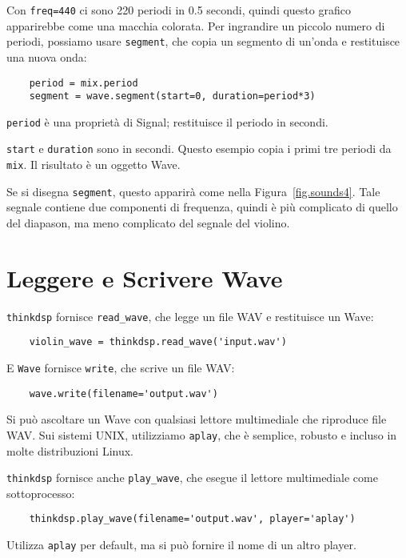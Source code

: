 \documentclass[12pt]{book} \usepackage[width=5.5in,height=8.5in, hmarginratio=3:2,vmarginratio=1:1]{geometry}
\begin{document}
Con {\tt freq=440} ci sono 220 periodi in 0.5 secondi, quindi questo grafico apparirebbe come una macchia colorata. Per ingrandire un piccolo numero di periodi, possiamo usare {\tt segment}, che copia un segmento di un'onda e restituisce una nuova onda:

\begin{verbatim} 
    period = mix.period
    segment = wave.segment(start=0, duration=period*3)
 \end{verbatim} 

{\tt period} è una proprietà di Signal; restituisce il periodo in secondi.

{\tt start} e {\tt duration} sono in secondi. Questo esempio copia i primi tre periodi da {\tt mix}. Il risultato è un oggetto Wave.

Se si disegna {\tt segment}, questo apparirà come nella Figura~\ref{fig.sounds4}. Tale segnale contiene due componenti di frequenza, quindi è più complicato di quello del diapason, ma meno complicato del segnale del violino.

\section{Leggere e Scrivere Wave} 

{\tt thinkdsp} fornisce \verb"read_wave", che legge un file WAV e restituisce un Wave:

\begin{verbatim} 
    violin_wave = thinkdsp.read_wave('input.wav')
 \end{verbatim} 

E {\tt Wave} fornisce {\tt write}, che scrive un file WAV:

\begin{verbatim} 
    wave.write(filename='output.wav')
 \end{verbatim} 

Si può ascoltare un Wave con qualsiasi lettore multimediale che riproduce file WAV. Sui sistemi UNIX, utilizziamo {\tt aplay}, che è semplice, robusto e incluso in molte distribuzioni Linux.

{\tt thinkdsp} fornisce anche \verb"play_wave", che esegue il lettore multimediale come sottoprocesso:

\begin{verbatim} 
    thinkdsp.play_wave(filename='output.wav', player='aplay')
 \end{verbatim} 

Utilizza {\tt aplay} per default, ma si può fornire il nome di un altro player.
\end{document}
